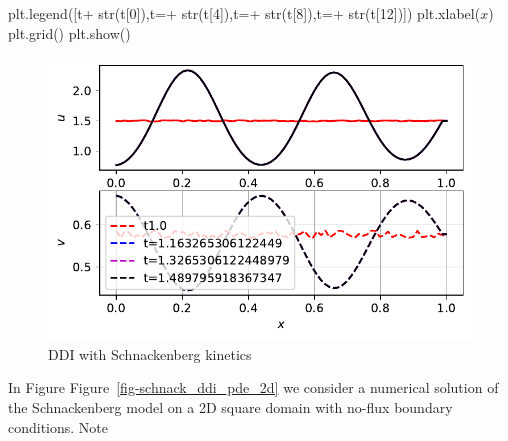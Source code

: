 \documentclass[
  letterpaper,
  DIV=11,
  numbers=noendperiod]{scrreprt}
\newenvironment{Shaded}{\begin{snugshade}}{\end{snugshade}}
\newcommand{\BuiltInTok}[1]{\textcolor[rgb]{0.00,0.23,0.31}{#1}}
\newcommand{\DecValTok}[1]{\textcolor[rgb]{0.68,0.00,0.00}{#1}}
\newcommand{\NormalTok}[1]{\textcolor[rgb]{0.00,0.23,0.31}{#1}}
\newcommand{\OperatorTok}[1]{\textcolor[rgb]{0.37,0.37,0.37}{#1}}
\newcommand{\StringTok}[1]{\textcolor[rgb]{0.13,0.47,0.30}{#1}}
\theoremstyle{plain}
\theoremstyle{definition}
\theoremstyle{plain}
\theoremstyle{remark}
\begin{document}
\begin{Shaded}
\begin{Highlighting}[]
\NormalTok{plt.legend([}\StringTok{\textquotesingle{}t\textquotesingle{}}\OperatorTok{+} \BuiltInTok{str}\NormalTok{(t[}\DecValTok{0}\NormalTok{]),}\StringTok{\textquotesingle{}t=\textquotesingle{}}\OperatorTok{+} \BuiltInTok{str}\NormalTok{(t[}\DecValTok{4}\NormalTok{]),}\StringTok{\textquotesingle{}t=\textquotesingle{}}\OperatorTok{+} \BuiltInTok{str}\NormalTok{(t[}\DecValTok{8}\NormalTok{]),}\StringTok{\textquotesingle{}t=\textquotesingle{}}\OperatorTok{+} \BuiltInTok{str}\NormalTok{(t[}\DecValTok{12}\NormalTok{])])}
\NormalTok{plt.xlabel(}\StringTok{\textquotesingle{}$x$\textquotesingle{}}\NormalTok{)}
\NormalTok{plt.grid()}
\NormalTok{plt.show()}
\end{Highlighting}
\end{Shaded}

\begin{figure}[H]

{\centering \includegraphics{DiffusionDrivenInstability_files/figure-pdf/fig-schnack_ddi_pde-output-1.pdf}

}

\caption{\label{fig-schnack_ddi_pde}DDI with Schnackenberg kinetics}

\end{figure}

In Figure Figure~\ref{fig-schnack_ddi_pde_2d} we consider a numerical
solution of the Schnackenberg model on a 2D square domain with no-flux
boundary conditions. Note
\end{document}
